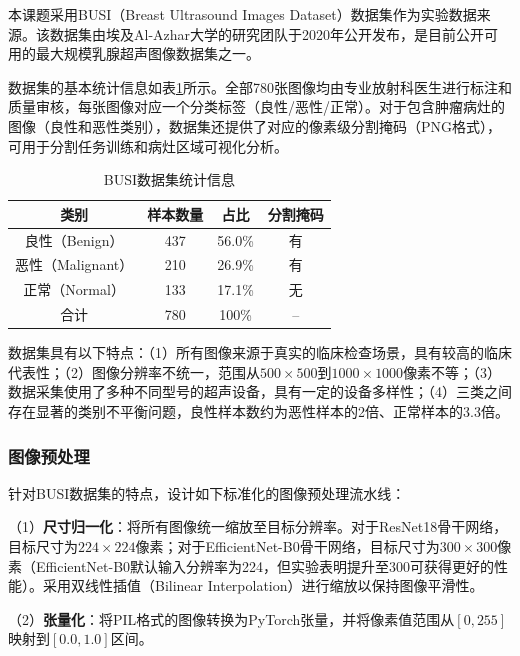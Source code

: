 本课题采用BUSI（Breast Ultrasound Images Dataset）数据集\cite{aldhabyani2020dataset}作为实验数据来源。该数据集由埃及Al-Azhar大学的研究团队于2020年公开发布，是目前公开可用的最大规模乳腺超声图像数据集之一。

数据集的基本统计信息如表\ref{tbl:dataset_stats}所示。全部780张图像均由专业放射科医生进行标注和质量审核，每张图像对应一个分类标签（良性/恶性/正常）。对于包含肿瘤病灶的图像（良性和恶性类别），数据集还提供了对应的像素级分割掩码（PNG格式），可用于分割任务训练和病灶区域可视化分析。

\begin{table}[htb]
    \centering
    \caption{BUSI数据集统计信息}
    \label{tbl:dataset_stats}
    \begin{tabular}{cccc}
        \toprule
        类别 & 样本数量 & 占比 & 分割掩码 \\
        \midrule
        良性（Benign）     & 437  & 56.0\% & 有 \\
        恶性（Malignant）  & 210  & 26.9\% & 有 \\
        正常（Normal）     & 133  & 17.1\% & 无 \\
        \midrule
        合计               & 780  & 100\% & -- \\
        \bottomrule
    \end{tabular}
\end{table}

数据集具有以下特点：（1）所有图像来源于真实的临床检查场景，具有较高的临床代表性；（2）图像分辨率不统一，范围从$500\times500$到$1000\times1000$像素不等；（3）数据采集使用了多种不同型号的超声设备，具有一定的设备多样性；（4）三类之间存在显著的类别不平衡问题，良性样本数约为恶性样本的2倍、正常样本的3.3倍。

\subsubsection{图像预处理}

针对BUSI数据集的特点，设计如下标准化的图像预处理流水线：

（1）\textbf{尺寸归一化}：将所有图像统一缩放至目标分辨率。对于ResNet18骨干网络，目标尺寸为$224\times224$像素；对于EfficientNet-B0骨干网络，目标尺寸为$300\times300$像素（EfficientNet-B0默认输入分辨率为224，但实验表明提升至300可获得更好的性能）。采用双线性插值（Bilinear Interpolation）进行缩放以保持图像平滑性。

（2）\textbf{张量化}：将PIL格式的图像转换为PyTorch张量，并将像素值范围从$[0, 255]$映射到$[0.0, 1.0]$区间。

